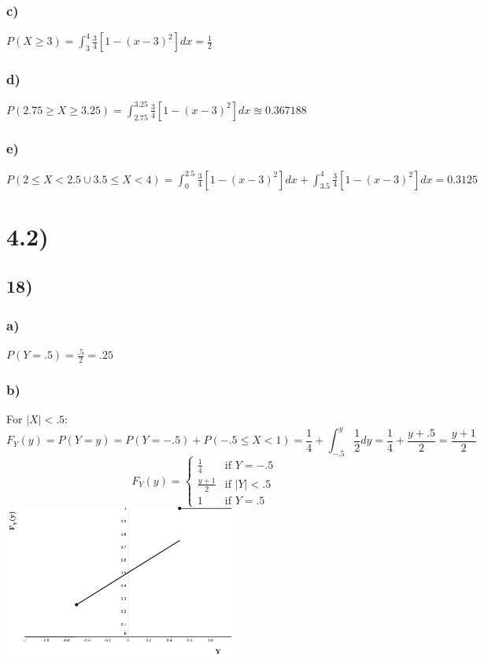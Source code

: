 \documentclass{article}
\begin{document}
		\subsubsection*{c)}
			$P(X \geq 3) = \int_3^4 \frac{3}{4}[1-(x-3)^2]dx = \frac{1}{2} $
		\subsubsection*{d)}
			$P(2.75 \geq X \geq 3.25) = \int_{2.75}^{3.25} \frac{3}{4}[1-(x-3)^2]dx \approxeq 0.367188 $
		\subsubsection*{e)}
			$P(2 \leq X < 2.5 \cup 3.5 \leq X < 4) = \int_{0}^{2.5} \frac{3}{4}[1-(x-3)^2]dx + \int_{3.5}^{4} \frac{3}{4}[1-(x-3)^2]dx = 0.3125 $
\section*{4.2)}
	\subsection*{18)}
		\subsubsection*{a)}
			$P(Y=.5) = \frac{.5}{2} = .25$
		\subsubsection*{b)}
			For $|X|<.5$:\\
			$$F_Y(y) = P(Y=y) = P(Y=-.5)+P(-.5 \leq X < 1) = \frac{1}{4}+ \int_{-.5}^y \frac{1}{2}dy = \frac{1}{4} + \frac{y+.5}{2} = \frac{y+1}{2} $$
			\begin{equation*}
				F_Y(y) =
				\begin{cases}
					\frac{1}{4} &\text{if $Y=-.5$} \\
					\frac{y+1}{2} &\text{if $|Y|<.5$} \\
					1 &\text{if $Y=.5$}
				\end{cases}
			\end{equation*}		
			\includegraphics[height=2in]{4-2--18b}
\end{document}
